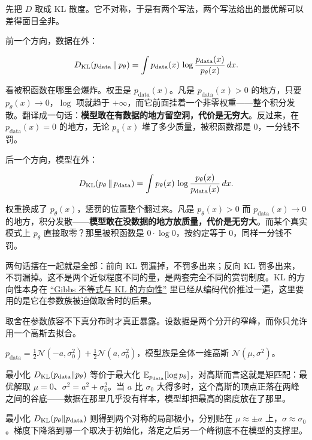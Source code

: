 先把 \(D\) 取成 KL 散度。它不对称，于是有两个写法，两个写法给出的最优解可以差得面目全非。

前一个方向，数据在外：

\[
D_{\mathrm{KL}}(p_{\text{data}}\,\Vert\,p_\theta)
=\int p_{\text{data}}(x)\,\log\frac{p_{\text{data}}(x)}{p_\theta(x)}\,dx.
\]

看被积函数在哪里会爆炸。权重是 \(p_{\text{data}}(x)\)。凡是 \(p_{\text{data}}(x)>0\) 的地方，只要 \(p_\theta(x)\to0\)，\(\log\) 项就趋于 \(+\infty\)，而它前面挂着一个非零权重——整个积分发散。翻译成一句话：\textbf{模型敢在有数据的地方留空洞，代价是无穷大}。反过来，在 \(p_{\text{data}}(x)=0\) 的地方，无论 \(p_\theta(x)\) 堆了多少质量，被积函数都是 \(0\)，一分钱不罚。

后一个方向，模型在外：

\[
D_{\mathrm{KL}}(p_\theta\,\Vert\,p_{\text{data}})
=\int p_\theta(x)\,\log\frac{p_\theta(x)}{p_{\text{data}}(x)}\,dx.
\]

权重换成了 \(p_\theta(x)\)，惩罚的位置整个翻过来。凡是 \(p_\theta(x)>0\) 而 \(p_{\text{data}}(x)\to0\) 的地方，积分发散——\textbf{模型敢在没数据的地方放质量，代价是无穷大}。而某个真实模式上 \(p_\theta\) 直接取零？那里被积函数是 \(0\cdot\log 0\)，按约定等于 \(0\)，同样一分钱不罚。

两句话摆在一起就是全部：前向 KL 罚漏掉，不罚多出来；反向 KL 罚多出来，不罚漏掉。这不是两个近似程度不同的量，是两套完全不同的赏罚制度。KL 的方向性本身在 \hyperref[sec:07-Information-Theory/03-Divergences/02]{``Gibbs 不等式与 KL 的方向性''} 里已经从编码代价推过一遍，这里要用的是它在参数族被迫做取舍时的后果。

取舍在参数族容不下真分布时才真正暴露。设数据是两个分开的窄峰，而你只允许用一个高斯去拟合。

\begin{example}
\(p_{\text{data}}=\tfrac12\mathcal N(-a,\sigma_0^2)+\tfrac12\mathcal N(a,\sigma_0^2)\)，模型族是全体一维高斯 \(\mathcal N(\mu,\sigma^2)\)。

最小化 \(D_{\mathrm{KL}}(p_{\text{data}}\Vert p_\theta)\) 等价于最大化 \(\mathbb{E}_{p_{\text{data}}}[\log p_\theta]\)，对高斯而言这就是矩匹配：最优解取 \(\mu=0\)、\(\sigma^2=a^2+\sigma_0^2\)。当 \(a\) 比 \(\sigma_0\) 大得多时，这个高斯的顶点正落在两峰之间的谷底——数据在那里几乎没有样本，模型却把最高的密度放在了那里。

最小化 \(D_{\mathrm{KL}}(p_\theta\Vert p_{\text{data}})\) 则得到两个对称的局部极小，分别贴在 \(\mu\approx\pm a\) 上，\(\sigma\approx\sigma_0\)。梯度下降落到哪一个取决于初始化，落定之后另一个峰彻底不在模型的支撑里。
\end{example}


